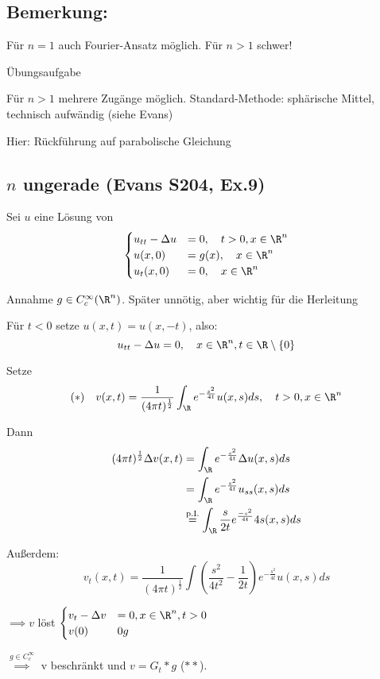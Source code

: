 \subsection{Bemerkung:}

Für $n = 1$ auch Fourier-Ansatz möglich. Für $n > 1$ schwer!

Übungsaufgabe

Für $n > 1$ mehrere Zugänge möglich. Standard-Methode: sphärische Mittel, technisch aufwändig (siehe Evans)

Hier: Rückführung auf parabolische Gleichung

\subsection{$n$ ungerade (Evans S204, Ex.9)}

Sei $u$ eine Lösung von 
$$
\begin{cases} 
u_{tt} - \Delta u &= 0, \quad t > 0, x \in \R^n \\ 
u(x, 0) &= g(x), \quad x \in \R^n \\ 
u_t(x, 0) &= 0, \quad x \in \R^n 
\end{cases}
$$

Annahme $g \in C_c^\infty(\R^n)$. {\tiny{Später unnötig, aber wichtig für die Herleitung}}

Für $t < 0$ setze $u(x, t) = u(x, -t)$, also:
$$
u_{tt} - \Delta u = 0, \quad x \in \R^n, t \in \R\setminus\{0\}
$$

Setze
$$
(\ast) \quad v(x,t) = \frac{1}{(4\pi t)^{\frac{1}{2}}} \int_\R e^{-\frac{s^2}{4 t}} u(x,s) ds, \quad t > 0, x \in \R^n
$$

Dann
\begin{align*}
(4 \pi t)^{\frac{1}{2}} \Delta v(x,t) 
&= \int_\R e^{-\frac{s^2}{4t}} \Delta u(x,s) ds \\
&= \int_\R e^{-\frac{s^2}{4t}} u_{ss}(x,s) ds \\
&\overset{\text{p.I.}}{=} \int_\R \frac{s}{2t} e^{\frac{-s^2}{4t}} 4s(x,s) ds
\end{align*}

Außerdem: $$v_t(x,t) = \frac{1}{(4\pi t)^{\frac{1}{2}}} \int\left( \frac{s^2}{4t^2} - \frac{1}{2t}\right) e^{-\frac{s^2}{4t}} u(x,s) ds$$

$\implies v$ löst $\begin{cases} v_t - \Delta v &= 0, x \in \R^n, t > 0 \\ v(0) &0 g \end{cases}$

$\overset{g \in C^\infty_c}{\implies} $ v beschränkt und $v = G_t \ast g$ ($\ast\ast$).

